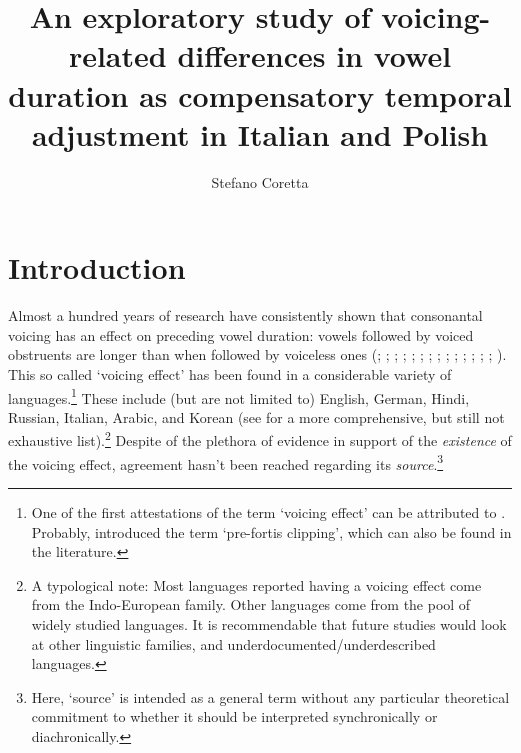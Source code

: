 \documentclass[12pt,]{article}
\title{An exploratory study of voicing-related differences in vowel duration as
compensatory temporal adjustment in Italian and Polish}
\author{Stefano Coretta}
\date{}
\let\rmarkdownfootnote\footnote%
\def\footnote{\protect\rmarkdownfootnote}
\begin{document}
\maketitle

\hypertarget{introduction}{%
\section{Introduction}\label{introduction}}

\label{s:intro}

Almost a hundred years of research have consistently shown that
consonantal voicing has an effect on preceding vowel duration: vowels
followed by voiced obstruents are longer than when followed by voiceless
ones (\citealt{meyer1904}; \citealt{heffner1937}; \citealt{house1953};
\citealt{belasco1953}; \citealt{peterson1960}; \citealt{halle1967};
\citealt{chen1970}; \citealt{klatt1973}; \citealt{lisker1974};
\citealt{laeufer1992}; \citealt{fowler1992}; \citealt{hussein1994};
\citealt{lampp2004}; \citealt{warren2005}; \citealt{durvasula2012}).
This so called `voicing effect' has been found in a considerable variety
of
languages.\footnote{One of the first attestations of the term `voicing effect' can be attributed to \citet{mitleb1982}. Probably, \citet{wells1990} introduced the term `pre-fortis clipping', which can also be found in the literature.}
These include (but are not limited to) English, German, Hindi, Russian,
Italian, Arabic, and Korean (see \citealt{maddieson1976} for a more
comprehensive, but still not exhaustive
list).\footnote{A typological note: Most languages reported having a voicing effect come from the Indo-European family. Other languages come from the pool of widely studied languages. It is recommendable that future studies would look at other linguistic families, and underdocumented/underdescribed languages.}
Despite of the plethora of evidence in support of the \emph{existence}
of the voicing effect, agreement hasn't been reached regarding its
\emph{source}.\footnote{Here, `source' is intended as a general term without any particular theoretical commitment to whether it should be interpreted synchronically or diachronically.
}
\end{document}
